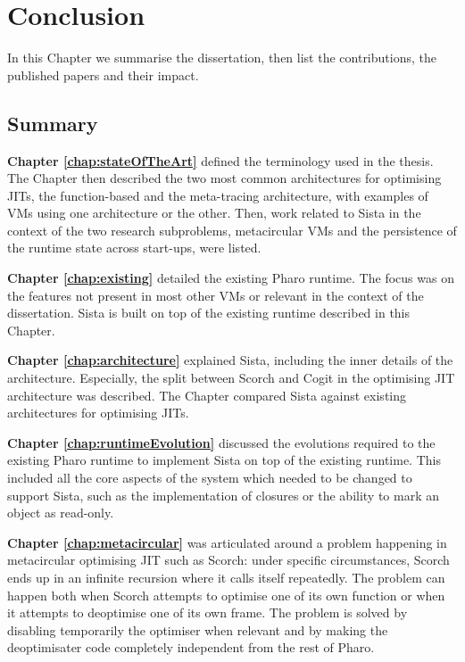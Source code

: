 \documentclass[a4paper,12pt,twoside]{../includes/ThesisStyle}
\begin{document}
\fi

\chapter{Conclusion}
\label{chap:conclusion}
\minitoc

In this Chapter we summarise the dissertation, then list the contributions, the published papers and their impact.

\section{Summary}

\hspace{0.5cm} \textbf{Chapter \ref{chap:stateOfTheArt}} defined the terminology used in the thesis. The Chapter then described the two most common architectures for optimising JITs, the function-based and the meta-tracing architecture, with examples of VMs using one architecture or the other. Then, work related to Sista in the context of the two research subproblems, metacircular VMs and the persistence of the runtime state across start-ups, were listed.

\textbf{Chapter \ref{chap:existing}} detailed the existing Pharo runtime. The focus was on the features not present in most other VMs or relevant in the context of the dissertation. Sista is built on top of the existing runtime described in this Chapter.

\textbf{Chapter \ref{chap:architecture}} explained Sista, including the inner details of the architecture. Especially, the split between Scorch and Cogit in the optimising JIT architecture was described. The Chapter compared Sista against existing architectures for optimising JITs.

\textbf{Chapter \ref{chap:runtimeEvolution}} discussed the evolutions required to the existing Pharo runtime to implement Sista on top of the existing runtime. This included all the core aspects of the system which needed to be changed to support Sista, such as the implementation of closures or the ability to mark an object as read-only.

\textbf{Chapter \ref{chap:metacircular}} was articulated around a problem happening in metacircular optimising JIT such as Scorch: under specific circumstances, Scorch ends up in an infinite recursion where it calls itself repeatedly. The problem can happen both when Scorch attempts to optimise one of its own function or when it attempts to deoptimise one of its own frame. The problem is solved by disabling temporarily the optimiser when relevant and by making the deoptimisater code completely independent from the rest of Pharo.
\end{document}

